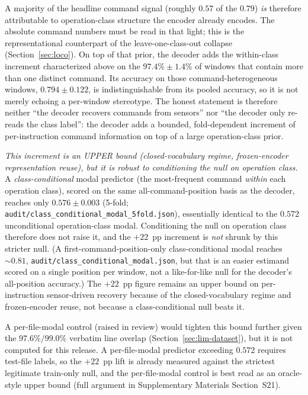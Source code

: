 \documentclass[sensors,article,submit,moreauthors,pdftex]{Definitions/mdpi}
\begin{document}
A majority of the headline command signal (roughly $0.57$ of the $0.79$) \emph{is} therefore attributable to operation-class structure the encoder already encodes. The absolute command numbers must be read in that light; this is the representational counterpart of the leave-one-class-out collapse (Section~\ref{sec:loco}). On top of that prior, the decoder adds the within-class increment characterized above on the $97.4\% \pm 1.4\%$ of windows that contain more than one distinct command. Its accuracy on those command-heterogeneous windows, $0.794 \pm 0.122$, is indistinguishable from its pooled accuracy, so it is not merely echoing a per-window stereotype. The honest statement is therefore neither ``the decoder recovers commands from sensors'' nor ``the decoder only re-reads the class label'': the decoder adds a bounded, fold-dependent increment of per-instruction command information on top of a large operation-class prior.

\emph{This increment is an UPPER bound (closed-vocabulary regime, frozen-encoder representation reuse), but it is robust to conditioning the null on operation class.} A \emph{class-conditional} modal predictor (the most-frequent command \emph{within} each operation class), scored on the same all-command-position basis as the decoder, reaches only $0.576 \pm 0.003$ (5-fold; \texttt{audit/class\_conditional\_modal\_5fold.json}), essentially identical to the $0.572$ unconditional operation-class modal. Conditioning the null on operation class therefore does not raise it, and the $+22$~pp increment is \emph{not} shrunk by this stricter null. (A first-command-position-only class-conditional modal reaches $\sim\!0.81$, \texttt{audit/class\_conditional\_modal.json}, but that is an easier estimand scored on a single position per window, not a like-for-like null for the decoder's all-position accuracy.) The $+22$~pp figure remains an upper bound on per-instruction sensor-driven recovery because of the closed-vocabulary regime and frozen-encoder reuse, not because a class-conditional null beats it.

A per-file-modal control (raised in review) would tighten this bound further given the $97.6\%/99.0\%$ verbatim line overlap (Section~\ref{sec:lim-dataset}), but it is not computed for this release. A per-file-modal predictor exceeding $0.572$ requires test-file labels, so the $+22$~pp lift is already measured against the strictest legitimate train-only null, and the per-file-modal control is best read as an oracle-style upper bound (full argument in Supplementary Materials Section~S21).
\end{document}
